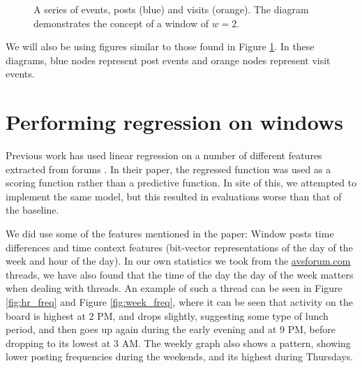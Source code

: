 \begin{figure}
	\begin{center}
	
	\caption{%
A series of events, posts (blue) and visits (orange).  The diagram demonstrates 
the concept of a window of $w=2$.
}\label{fig:event_series}
	\end{center}
\end{figure}

We will also be using figures similar to those found in Figure 
\ref{fig:event_series}. In these diagrams, blue nodes represent post events and 
orange nodes represent visit events.


\section{Performing regression on windows}
Previous work has used linear regression on a number of different features 
extracted from forums \cite{Yang2009}. In their paper, the regressed function 
was used as a scoring function rather than a predictive function. In site of 
this, we attempted to implement the same model, but this resulted in evaluations 
worse than that of the baseline.

We did use some of the features mentioned in the paper: Window posts time 
differences and time context features (bit-vector representations of the day of 
the week and hour of the day). In our own statistics we took from the 
\url{avsforum.com} threads, 
we have also found that the time of the day the day 
of the week matters when dealing with threads. An example of such a thread can 
be seen in Figure \ref{fig:hr_freq} and Figure \ref{fig:week_freq}, where it can 
be seen that activity on the board is highest at 2 PM, and drops slightly, 
suggesting some type of lunch period, and then goes up again during the early 
evening and at 9 PM, before dropping to its lowest at 3 AM. The weekly graph 
also shows a pattern, showing lower posting frequencies during the weekends, and 
its highest during Thursdays.

